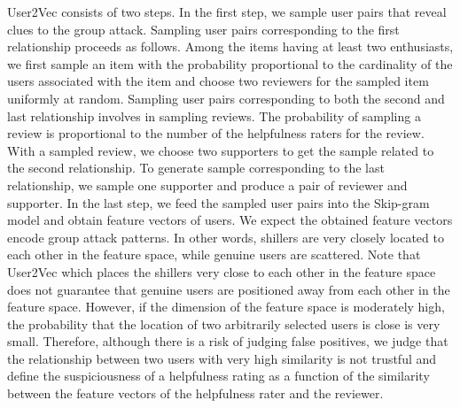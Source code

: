 \documentclass[master,english,final]{kaist-ucs}
\begin{document}
User2Vec consists of two steps.
In the first step, we sample user pairs that reveal clues to the group attack.
Sampling user pairs corresponding to the first relationship proceeds as follows.
Among the items having at least two enthusiasts, we first sample an item with the probability proportional to the cardinality of the users associated with the item and choose two reviewers for the sampled item uniformly at random.
Sampling user pairs corresponding to both the second and last relationship involves in sampling reviews.
The probability of sampling a review is proportional to the number of the helpfulness raters for the review.
With a sampled review, we choose two supporters to get the sample related to the second relationship.
To generate sample corresponding to the last relationship, we sample one supporter and produce a pair of reviewer and supporter.
In the last step, we feed the sampled user pairs into the Skip-gram model and obtain feature vectors of users.
We expect the obtained feature vectors encode group attack patterns.
In other words, shillers are very closely located to each other in the feature space, while genuine users are scattered.
Note that User2Vec which places the shillers very close to each other in the feature space does not guarantee that genuine users are positioned away from each other in the feature space.
However, if the dimension of the feature space is moderately high, the probability that the location of two arbitrarily selected users is close is very small.
Therefore, although there is a risk of judging false positives, we judge that the relationship between two users with very high similarity is not trustful and define the suspiciousness of a helpfulness rating as a function of the similarity between the feature vectors of the helpfulness rater and the reviewer.
\end{document}
